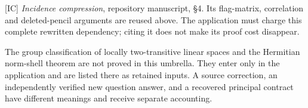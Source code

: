 \documentclass[
  11pt,
  a4paper,
]{article}
\begin{document}
{[}IC{]} \emph{Incidence compression}, repository manuscript, §4. Its
flag-matrix, correlation and deleted-pencil arguments are reused above.
The application must charge this complete rewritten dependency; citing
it does not make its proof cost disappear.

The group classification of locally two-transitive linear spaces and the
Hermitian norm-shell theorem are not proved in this umbrella. They enter
only in the application and are listed there as retained inputs. A
source correction, an independently verified new question answer, and a
recovered principal contract have different meanings and receive
separate accounting.
\end{document}
